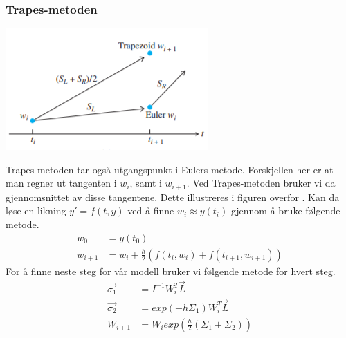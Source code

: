 \subsubsection{Trapes-metoden}
\begin{center}
    \includegraphics{rapport/teori/bilder/trapezoid.PNG}
\end{center}
Trapes-metoden tar også utgangspunkt i Eulers metode. Forskjellen her er at man regner ut tangenten i $w_i$, samt i $w_{i+1}$. Ved Trapes-metoden bruker vi da gjennomsnittet av disse tangentene. Dette illustreres i figuren overfor \cite{MATEMATIKK:1}.\newline\newline
Kan da løse en likning $y' = f(t, y)$ ved å finne $w_i \approx y(t_i)$ gjennom å bruke følgende metode. 
\begin{equation}
\begin{aligned}
    w_0&=y(t_0)\\
    w_{i+1}&=w_i + \frac{h}{2}(f(t_i, w_i)+f(t_{i+1}, w_{i+1}))
\end{aligned}
\end{equation}
For å finne neste steg for vår modell bruker vi følgende metode for hvert steg.
\begin{equation}
\begin{aligned}
    \Vec{\sigma_1}&=I^{-1}W^T_i\Vec{L}\\
    \Vec{\sigma_2}&=exp(-h\Sigma_1)W^T_i\Vec{L}\\
    W_{i+1}&=W_iexp(\frac{h}{2}(\Sigma_1 + \Sigma_2))
\end{aligned}
\end{equation}

